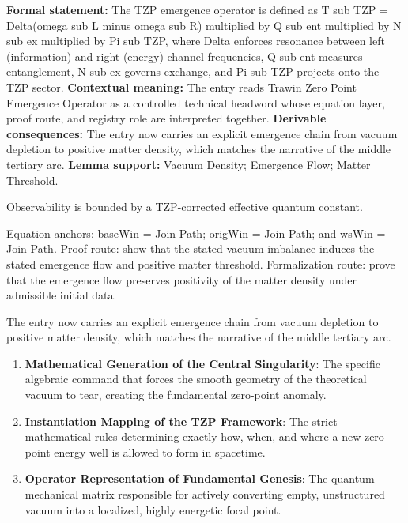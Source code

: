 \begingroup\footnotesize\setlength{\emergencystretch}{3em}\sloppy
\textbf{Formal statement:} The TZP emergence operator is defined as T sub TZP = Delta(omega sub L minus omega sub R) multiplied by Q sub ent multiplied by N sub ex multiplied by Pi sub TZP, where Delta enforces resonance between left (information) and right (energy) channel frequencies, Q sub ent measures entanglement, N sub ex governs exchange, and Pi sub TZP projects onto the TZP sector. \textbf{Contextual meaning:} The entry reads Trawin Zero Point Emergence Operator as a controlled technical headword whose equation layer, proof route, and registry role are interpreted together. \textbf{Derivable consequences:} The entry now carries an explicit emergence chain from vacuum depletion to positive matter density, which matches the narrative of the middle tertiary arc. \textbf{Lemma support:} Vacuum Density; Emergence Flow; Matter Threshold.\par
\endgroup

Observability is bounded by a TZP-corrected effective quantum constant.

Equation anchors: baseWin = Join-Path; origWin = Join-Path; and wsWin = Join-Path. Proof route: show that the stated vacuum imbalance induces the stated emergence flow and positive matter threshold. Formalization route: prove that the emergence flow preserves positivity of the matter density under admissible initial data.

The entry now carries an explicit emergence chain from vacuum depletion to positive matter density, which matches the narrative of the middle tertiary arc.
\endgroup

\begin{enumerate}[leftmargin=1.6em,itemsep=6pt,topsep=4pt]
\item \textbf{Mathematical Generation of the Central Singularity}: The specific algebraic command that forces the smooth geometry of the theoretical vacuum to tear, creating the fundamental zero-point anomaly.
\item \textbf{Instantiation Mapping of the TZP Framework}: The strict mathematical rules determining exactly how, when, and where a new zero-point energy well is allowed to form in spacetime.
\item \textbf{Operator Representation of Fundamental Genesis}: The quantum mechanical matrix responsible for actively converting empty, unstructured vacuum into a localized, highly energetic focal point.
\end{enumerate}

